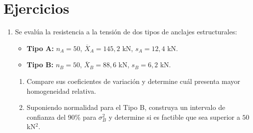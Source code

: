 \documentclass[letterpaper,12pt]{article}
\newenvironment{ejercicios}{%
    \section*{Ejercicios}
}{}
\begin{document}
\begin{ejercicios}
\begin{enumerate}[resume,leftmargin=*,itemsep=0.9em]
    \item Se evalúa la resistencia a la tensión de dos tipos de anclajes estructurales:
    \begin{itemize}
        \item \textbf{Tipo A:} $n_A=50$, $\overline X_A=145{,}2$ kN, $s_A=12{,}4$ kN.
        \item \textbf{Tipo B:} $n_B=50$, $\overline X_B=88{,}6$ kN, $s_B=6{,}2$ kN.
    \end{itemize}
    \begin{enumerate}[label=\alph*)]
        \item Compare sus coeficientes de variación y determine cuál presenta mayor homogeneidad relativa.
        \item Suponiendo normalidad para el Tipo B, construya un intervalo de confianza del 90\% para $\sigma_B^2$ y determine si es factible que sea superior a $50$ kN$^2$.
    \end{enumerate}

\end{enumerate}
\endgroup
\end{ejercicios}
\end{document}
